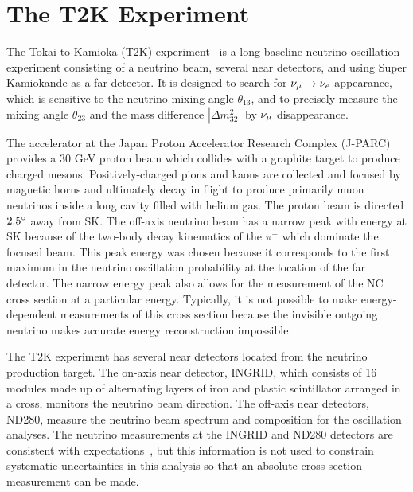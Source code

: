 \documentclass[
aps,
prd,
twocolumn,
superscriptaddress,
showpacs
]{revtex4-1}
\begin{document}
\section{The T2K Experiment}

The Tokai-to-Kamioka (T2K) experiment~\cite{Abe:2011ks} is a long-baseline neutrino oscillation experiment consisting of a neutrino beam, several near detectors, and using Super Kamiokande as a far detector. It is designed to search for $\nu_\mu \to \nu_e$ appearance, which is sensitive to the neutrino mixing angle $\theta_{13}$, and to precisely measure the mixing angle $\theta_{23}$ and the mass difference $|\Delta m_{32}^{2}|$ by $\nu_\mu$ disappearance. 

The accelerator at the Japan Proton Accelerator Research Complex (J-PARC) provides a 30 GeV proton beam which collides with a graphite target to produce charged mesons. Positively-charged pions and kaons are collected and focused by magnetic horns and ultimately decay in flight to produce primarily muon neutrinos inside a  long cavity filled with helium gas. The proton beam is directed $2.5^{\circ}$ away from SK.  The off-axis neutrino beam has a narrow peak with \fluxtype energy \fluxmean at SK because of the two-body decay kinematics of the $\pi^+$ which dominate the focused beam.  This peak energy was chosen because it corresponds to the first maximum in the neutrino oscillation probability at the location of the far detector. The narrow energy peak also allows for the measurement of the NC cross section at a particular energy. Typically, it is not possible to make energy-dependent measurements of this cross section because the invisible outgoing neutrino makes accurate energy reconstruction impossible.

The T2K experiment has several near detectors located  from the neutrino production target. The on-axis near detector, INGRID, which consists of 16 modules made up of alternating layers of iron and plastic scintillator arranged in a cross, monitors the neutrino beam direction. 
The off-axis near detectors, ND280, measure the neutrino beam spectrum and composition for the oscillation analyses. The neutrino measurements at the INGRID and ND280 detectors are consistent with expectations~\cite{Abe:2013jth}, but this information is not used to constrain systematic uncertainties in this analysis so that an absolute cross-section measurement can be made.
\end{document}

